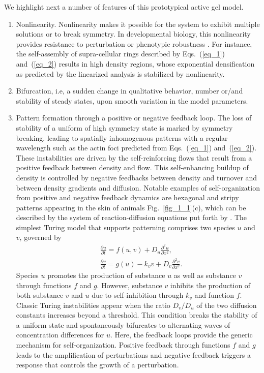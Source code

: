 We highlight next a number of features of this prototypical active gel model.\begin{enumerate}
	\item Nonlinearity. Nonlinearity makes it possible for the system to exhibit multiple solutions or to break symmetry. {In developmental biology, this nonlinearity provides resistance to perturbation or phenotypic robustness} \cite{green2017}. For instance, the self-assembly of supra-cellular rings described by Eqs.~(\ref{eq_1}) and~(\ref{eq_2}) results in high density regions, whose exponential densification as predicted by the linearized analysis is stabilized by nonlinearity.

	\item Bifurcation, i.e, a sudden change in qualitative behavior, number or/and stability of steady states, upon smooth variation in the model parameters.
	\item Pattern formation through a positive or negative feedback loop.
	The loss of stability of a uniform of high symmetry state is marked by symmetry breaking, leading to spatially inhomogenous patterns with a regular wavelength such as the actin foci predicted from Eqs.~(\ref{eq_1}) and~(\ref{eq_2}). These instabilities are driven by the self-reinforcing flows that result from a positive feedback between density and flow. This self-enhancing buildup of density is controlled by negative feedbacks between density and turnover and between density gradients and diffusion. Notable examples of self-organization from positive and negative feedback dynamics are hexagonal and stripy patterns appearing in the skin of animals Fig.~\ref{fig_1_1}(c), which  can be  described by the system of reaction-diffusion equations put forth by  \citet{turing1952}. The simplest Turing model that supports patterning comprises two species  $u$ and $v$, governed by
	\begin{align}
		& \frac{\partial u}{\partial t} =f(u,v) +D_u \frac{\partial^2 u}{\partial x^2},  \\ &
		\frac{\partial v}{\partial t}=g(u)  - k_v v + D_v \frac{\partial^2 v}{\partial x^2}.  \nonumber
	\end{align}
	Species $u$ promotes the production of  substance $u$ as well as substance $v$ through functions $f$ and $g$. However, substance $v$ inhibits the production of both substance $v$ and $u$ due to self-inhibition through $k_v$ and function $f$. Classic Turing instabilities appear when the ratio $D_v/D_u$ of the two diffusion constants increases beyond a threshold. This condition breaks the stability of a uniform state and spontaneously bifurcates to alternating  waves of concentration differences for $u$. Here, the feedback loops provide the generic mechanism for self-organization. Positive feedback through functions $f$ and $g$ leads to the amplification of perturbations and negative feedback triggers a response that controls the growth of a perturbation.
\end{enumerate}

